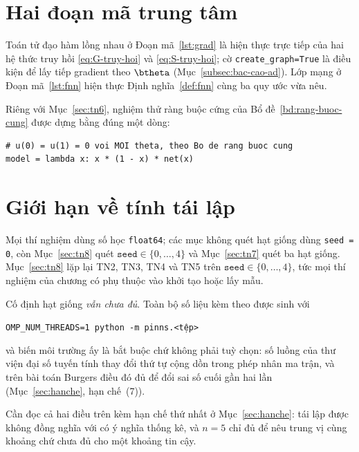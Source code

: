 \section{Hai đoạn mã trung tâm}

Toán tử đạo hàm lồng nhau ở Đoạn mã~\ref{lst:grad} là hiện thực trực tiếp của hai
hệ thức truy hồi \eqref{eq:G-truy-hoi} và \eqref{eq:S-truy-hoi}; cờ
\texttt{create\_graph=True} là điều kiện để lấy tiếp gradient theo $\btheta$
(Mục~\ref{subsec:bac-cao-ad}). Lớp mạng ở Đoạn mã~\ref{lst:fnn} hiện thực
Định nghĩa~\ref{def:fnn} cùng ba quy ước vừa nêu.

Riêng với Mục~\ref{sec:tn6}, nghiệm thử ràng buộc cứng của
Bổ đề~\ref{bd:rang-buoc-cung} được dựng bằng đúng một dòng:

\begin{lstlisting}[caption={Nghiệm thử thoả điều kiện biên theo cấu trúc.},label={lst:hard}]
# u(0) = u(1) = 0 voi MOI theta, theo Bo de rang buoc cung
model = lambda x: x * (1 - x) * net(x)
\end{lstlisting}

\section{Giới hạn về tính tái lập}

Mọi thí nghiệm dùng số học \texttt{float64}; các mục không quét hạt giống dùng
\texttt{seed = 0}, còn Mục~\ref{sec:tn8} quét $\texttt{seed} \in \{0,\dots,4\}$
và Mục~\ref{sec:tn7} quét ba hạt giống. Mục~\ref{sec:tn8} lặp lại TN2, TN3, TN4
và TN5 trên $\texttt{seed} \in \{0,\dots,4\}$, tức mọi thí nghiệm của chương có
phụ thuộc vào khởi tạo hoặc lấy mẫu.

Cố định hạt giống \emph{vẫn chưa đủ}. Toàn bộ số liệu kèm theo được sinh với
\begin{center}
\texttt{OMP\_NUM\_THREADS=1 python -m pinns.<tệp>}
\end{center}
và biến môi trường ấy là bắt buộc chứ không phải tuỳ chọn: số luồng của thư viện
đại số tuyến tính thay đổi thứ tự cộng dồn trong phép nhân ma trận, và trên bài
toán Burgers điều đó đủ để đổi sai số cuối gần hai lần
(Mục~\ref{sec:hanche}, hạn chế~(7)).

Cần đọc cả hai điều trên kèm hạn chế thứ nhất ở Mục~\ref{sec:hanche}: tái lập
được không đồng nghĩa với có ý nghĩa thống kê, và $n = 5$ chỉ đủ để nêu trung vị
cùng khoảng chứ chưa đủ cho một khoảng tin cậy.
